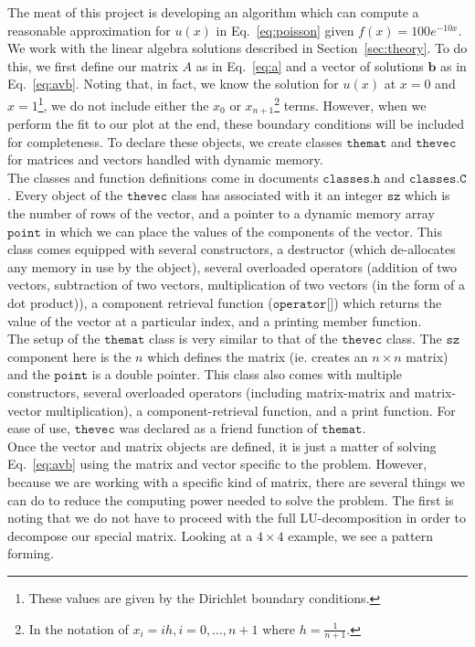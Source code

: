 \documentclass[12pt]{article}
\numberwithin{equation}{section}
\begin{document}
The meat of this project is developing an algorithm which can compute a reasonable approximation for $u\left(x\right)$ in Eq.~\ref{eq:poisson} given $f\left(x\right) = 100e^{-10x}$.  We work with the linear algebra solutions described in Section~\ref{sec:theory}.  To do this, we first define our matrix $A$ as in Eq.~\ref{eq:a} and a vector of solutions $\textbf{b}$ as in Eq.~\ref{eq:avb}.  Noting that, in fact, we know the solution for $u\left(x\right)$ at $x=0$ and $x=1$\footnote{These values are given by the Dirichlet boundary conditions.}, we do not include either the $x_{0}$ or $x_{n+1}$\footnote{In the notation of $x_{i}=ih,i=0,\ldots,n+1$ where $h=\frac{1}{n+1}$.} terms.  However, when we perform the fit to our plot at the end, these boundary conditions will be included for completeness.  To declare these objects, we create classes $\texttt{themat}$ and $\texttt{thevec}$ for matrices and vectors handled with dynamic memory. 
\\\indent The classes and function definitions come in documents $\texttt{classes.h}$ and $\texttt{classes.C}$.  Every object of the $\texttt{thevec}$ class has associated with it an integer $\texttt{sz}$ which is the number of rows of the vector, and a pointer to a dynamic memory array $\texttt{point}$ in which we can place the values of the components of the vector.  This class comes equipped with several constructors, a destructor (which de-allocates any memory in use by the object), several overloaded operators (addition of two vectors, subtraction of two vectors, multiplication of two vectors (in the form of a dot product)), a component retrieval function ($\texttt{operator[]}$) which returns the value of the vector at a particular index, and a printing member function.  
\\\indent The setup of the $\texttt{themat}$ class is very similar to that of the $\texttt{thevec}$ class.  The $\texttt{sz}$ component here is the $n$ which defines the matrix (ie. creates an $n\times n$ matrix) and the $\texttt{point}$ is a double pointer.  This class also comes with multiple constructors, several overloaded operators (including matrix-matrix and matrix-vector multiplication), a component-retrieval function, and a print function.  For ease of use, $\texttt{thevec}$ was declared as a friend function of $\texttt{themat}$.  
\\\indent Once the vector and matrix objects are defined, it is just a matter of solving Eq.~\ref{eq:avb} using the matrix and vector specific to the problem.  However, because we are working with a specific kind of matrix, there are several things we can do to reduce the computing power needed to solve the problem.  The first is noting that we do not have to proceed with the full LU-decomposition in order to decompose our special matrix.  Looking at a $4\times4$ example, we see a pattern forming. 
\end{document}
